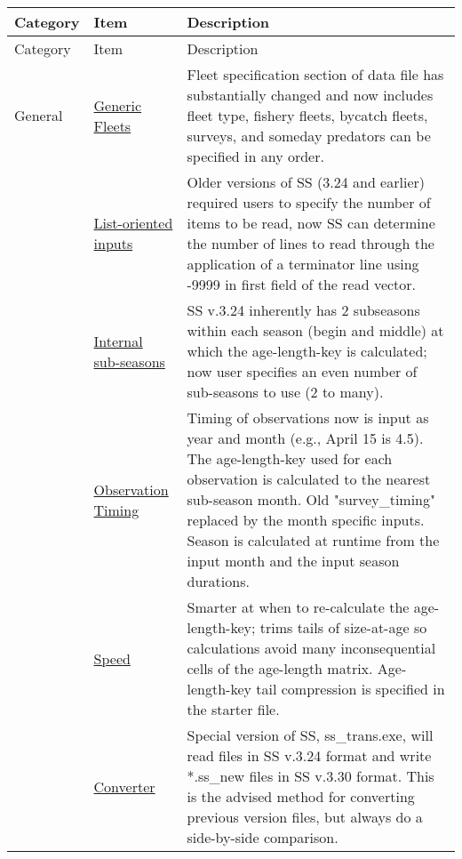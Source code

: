 \begin{center}
	{\renewcommand{\arraystretch}{1.5}%
	\begin{longtable}{p{2cm} p{3cm} p{10cm}}
		\hline
		Category & Item & Description\\
		\hline
		\endfirsthead
		\hline
		\toprule
		Category & Item & Description\\
		\hline
		\endhead

		\hline
		\endfoot

		\endlastfoot
		
		General & 
			\hyperlink{GenericFleets}{Generic Fleets} & 
				Fleet specification section of data file has substantially changed and now includes fleet type, fishery fleets, bycatch fleets, surveys, and someday predators can be specified in any order.\\

		  & \hyperlink{ListBased}{List-oriented inputs} & 
			    Older versions of SS (3.24 and earlier) required users to specify the number of items to be read, now SS can determine the number of lines to read through the application of a terminator line using -9999 in first field of the read vector. \\
		  
		  & \hyperlink{SubSeas}{Internal sub-seasons} & 
			    SS v.3.24 inherently has 2 subseasons within each season (begin and middle) at which the age-length-key is calculated; now user specifies an even number of sub-seasons to use (2 to many). \\

		  & \hyperlink{ObsTiming}{Observation Timing} & 
			    Timing of observations now is input as year and month (e.g., April 15 is 4.5). The age-length-key used for each observation is calculated to the nearest sub-season month.  Old "survey\_timing" replaced by the month specific inputs.  Season is calculated at runtime from the input month and the input season durations. \\

		  & \hyperlink{ALK}{Speed} & 
			    Smarter at when to re-calculate the age-length-key; trims tails of size-at-age so calculations avoid many inconsequential cells of the age-length matrix. Age-length-key tail compression is specified in the starter file.\\
		
		  & \hyperlink{Convert} {Converter} & 
			    Special version of SS, ss\_trans.exe, will read files in SS v.3.24 format and write *.ss\_new files in SS v.3.30 format.  This is the advised method for converting previous version files, but always do a side-by-side comparison.\\


\end{longtable}}
\end{center}
